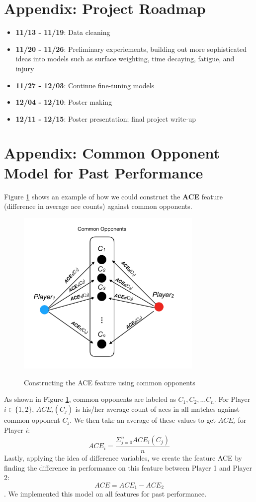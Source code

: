 \documentclass[paper=a4, fontsize=11pt]{scrartcl} %
\numberwithin{equation}{section} %
\numberwithin{figure}{section} %
\numberwithin{table}{section} %
\begin{document}
\section{Appendix: Project Roadmap}
\begin{itemize}
\item \textbf{11/13 - 11/19}: Data cleaning
\item \textbf{11/20 - 11/26}: Preliminary experiements, building out more sophisticated ideas into models such as surface weighting, time decaying, fatigue, and injury
\item \textbf{11/27 - 12/03}: Continue fine-tuning models
\item \textbf{12/04 - 12/10}: Poster making
\item \textbf{12/11 - 12/15}: Poster presentation; final project write-up
\end{itemize}

\section{Appendix: Common Opponent Model for Past Performance}
\label{sec:commonopp}
Figure \ref{fig:CO} shows an example of how we could construct the \textbf{ACE} feature (difference in average ace counts) against common opponents. 
\begin{figure}
  \caption{Constructing the ACE feature using common opponents}
  \centering
    \includegraphics[width=0.8\textwidth]{CO}
  \label{fig:CO}
\end{figure}
As shown in Figure \ref{fig:CO}, common opponents are labeled as $C_1, C_2, ...C_n$. For Player $i \in \{1,2\}$, $ACE_i(C_j)$ is his/her average count of aces in all matches against common opponent $C_j$. We then take an average of these values to get $ACE_i$ for Player $i$: $$ACE_i = \frac{\Sigma_{j=0}^n ACE_i(C_j)}{n}$$
Lastly, applying the idea of difference variables, we create the feature ACE by finding the difference in performance on this feature between Player 1 and Player 2: $$ACE = ACE_1 - ACE_2$$.  We implemented this model on all features for past performance.
\end{document}
